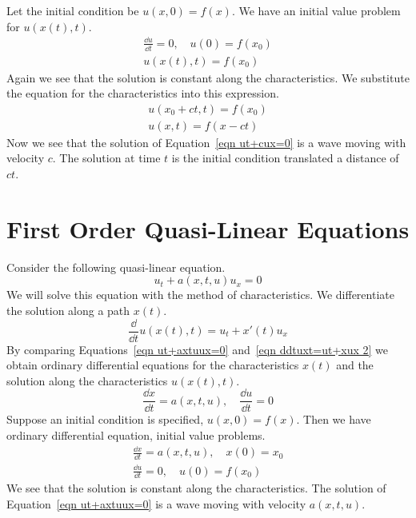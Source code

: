 Let the initial condition be $u(x,0) = f(x)$.  We have an initial value 
problem for $u(x(t),t)$.
\begin{gather*}
  \frac{\dd u}{\dd t} = 0, \quad u(0) = f(x_0)
  \\
  u(x(t),t) = f(x_0)
\end{gather*}
Again we see that the solution is constant along the characteristics.
We substitute the equation for the characteristics into this expression.
\begin{gather*}
  u(x_0 + c t,t) = f(x_0)
  \\
  u(x,t) = f(x - c t)
\end{gather*}
Now we see that the solution of Equation~\ref{eqn ut+cux=0} is a wave moving
with velocity $c$.  The solution at time $t$ is the initial condition 
translated a distance of $c t$.







\section{First Order Quasi-Linear Equations}




Consider the following quasi-linear equation.
\begin{equation}
  \label{eqn ut+axtuux=0}
  u_t + a(x,t,u) u_x = 0
\end{equation}
We will solve this equation with the method of characteristics.
We differentiate the solution along a path $x(t)$.
\begin{equation}
  \label{eqn ddtuxt=ut+xux 2}
  \frac{\dd}{\dd t} u(x(t),t) = u_t + x'(t) u_x
\end{equation}
By comparing Equations~\ref{eqn ut+axtuux=0} and~\ref{eqn ddtuxt=ut+xux 2} we 
obtain ordinary differential equations for the characteristics $x(t)$ and
the solution along the characteristics $u(x(t),t)$.
\[
\frac{\dd x}{\dd t} = a(x,t,u), \quad \frac{\dd u}{\dd t} = 0
\]
Suppose an initial condition is specified, $u(x,0) = f(x)$.  Then we have 
ordinary differential equation, initial value problems.
\begin{gather*}
  \frac{\dd x}{\dd t} = a(x,t,u), \quad x(0) = x_0
  \\
  \frac{\dd u}{\dd t} = 0, \quad u(0) = f(x_0)
\end{gather*}
We see that the solution is constant along the characteristics.
The solution of Equation~\ref{eqn ut+axtuux=0} is a wave moving
with velocity $a(x,t,u)$.





